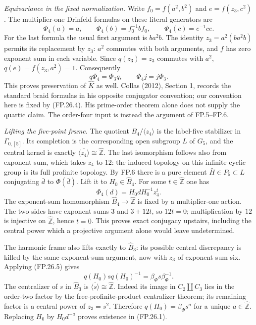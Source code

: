 \emph{Equivariance in the fixed normalization.}
Write $f_0=f(a^2,b^2)$ and $e=f(z_3,c^2)$. The multiplier-one
Drinfeld formulas on these literal generators are
\[
 \Phi_4(a)=a,\qquad
 \Phi_4(b)=f_0^{-1}bf_0,\qquad
 \Phi_4(c)=e^{-1}ce.
 \tag{FP.26.4}
\]
For the last formula the usual first argument is $ba^2b$.
The identity $z_3=a^2(ba^2b)$ permits its replacement by $z_3$:
$a^2$ commutes with both arguments, and $f$ has zero exponent sum in
each variable. Since $q(z_3)=z_3$ commutes with $a^2$,
$q(e)=f(z_3,a^2)=1$. Consequently
\[
 q\Phi_4=\Phi_3q,\qquad \Phi_4j=j\Phi_3.
 \tag{FP.26.5}
\]
This proves preservation of $\widehat K$ as well. Collas (2012),
Section 1, records the standard braid formulas in his opposite
conjugator convention; our convention here is fixed by (FP.26.4).
His prime-order theorem alone does not supply the quartic claim.
The order-four input is instead the argument of FP.5--FP.6.

\emph{Lifting the five-point frame.}
The quotient $B_4/\langle z_4\rangle$ is the label-five stabilizer in
$\Gamma_{0,[5]}$. Its completion is the corresponding open subgroup
$L$ of $G_5$, and the central kernel is exactly
$\overline{\langle z_4\rangle}\cong\widehat{\mathbb Z}$.
The last isomorphism follows also from exponent sum, which takes
$z_4$ to $12$: the induced topology on this infinite cyclic group is
its full profinite topology. By FP.6 there is a pure element
$\bar H\in P_5\subset L$ conjugating $\bar d$ to
$\Phi(\bar d)$. Lift it to $H_0\in\widehat B_4$. For some
$t\in\widehat{\mathbb Z}$ one has
\[
 \Phi_4(d)=H_0dH_0^{-1}z_4^t.
\]
The exponent-sum homomorphism $\widehat B_4\to\widehat{\mathbb Z}$
is fixed by a multiplier-one action. The two sides have exponent sums
$3$ and $3+12t$, so $12t=0$; multiplication by $12$ is injective on
$\widehat{\mathbb Z}$, hence $t=0$. This proves exact conjugacy
upstairs, including the central power which a projective argument alone
would leave undetermined.

The harmonic frame also lifts exactly to $\widehat B_3$:
its possible central discrepancy is killed by the same exponent-sum
argument, now with $z_3$ of exponent sum six. Applying (FP.26.5) gives
\[
 q(H_0)sq(H_0)^{-1}=\beta_\Phi s\beta_\Phi^{-1}.
\]
The centralizer of $s$ in $\widehat B_3$ is
$\overline{\langle s\rangle}\cong\widehat{\mathbb Z}$.
Indeed its image in $C_2\amalg C_3$ lies in the order-two factor by
the free-profinite-product centralizer theorem; its remaining factor
is a central power of $z_3=s^2$. Therefore
$q(H_0)=\beta_\Phi s^a$ for a unique $a\in\widehat{\mathbb Z}$.
Replacing $H_0$ by $H_0d^{-a}$ proves existence in (FP.26.1).

